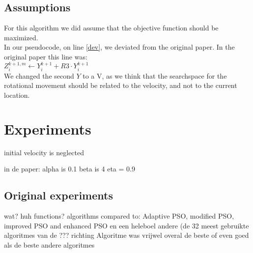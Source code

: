\documentclass[runningheads]{llncs}
\begin{document}
\newpage
\subsection{Assumptions}
For this algorithm we did assume that the objective function should be maximized.\\
In our pseudocode, on line \ref{dev}, we deviated from the original paper. In the original paper this line was: \\
$Z_i^{k+1, m} \leftarrow Y_i^{k+1} + R3 \cdot Y_i^{k+1}$ \\
We changed the second $ Y $ to a V, as we think that the searchspace for the rotational movement should be related to the velocity, and not to the current location.\\

\section{Experiments}


initial velocity is neglected

in de paper:
alpha is 0.1
beta is 4
eta = 0.9


\subsection{Original experiments}
wat?
huh functions?
algorithms compared to: Adaptive PSO, modified PSO, improved PSO and enhanced PSO en een heleboel andere (de 32 meest gebruikte algoritmes van de ??? richting
Algoritme was vrijwel overal de beste of even goed als de beste andere algoritmes
\end{document}
